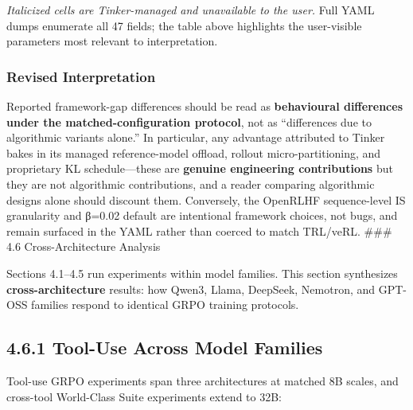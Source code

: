 \documentclass[
  american,
  11pt,
  a4paper,
  oneside]{report}
\begin{document}
\emph{Italicized cells are Tinker-managed and unavailable to the user.}
Full YAML dumps enumerate all 47 fields; the table above highlights the
user-visible parameters most relevant to interpretation.

\subsubsection{Revised Interpretation}\label{revised-interpretation}

Reported framework-gap differences should be read as \textbf{behavioural
differences under the matched-configuration protocol}, not as
``differences due to algorithmic variants alone.'' In particular, any
advantage attributed to Tinker bakes in its managed reference-model
offload, rollout micro-partitioning, and proprietary KL schedule---these
are \textbf{genuine engineering contributions} but they are not
algorithmic contributions, and a reader comparing algorithmic designs
alone should discount them. Conversely, the OpenRLHF sequence-level IS
granularity and β=0.02 default are intentional framework choices, not
bugs, and remain surfaced in the YAML rather than coerced to match
TRL/veRL. \#\#\# 4.6 Cross-Architecture Analysis

Sections 4.1--4.5 run experiments within model families. This section
synthesizes \textbf{cross-architecture} results: how Qwen3, Llama,
DeepSeek, Nemotron, and GPT-OSS families respond to identical GRPO
training protocols.

\subsection{4.6.1 Tool-Use Across Model
Families}\label{tool-use-across-model-families}

Tool-use GRPO experiments span three architectures at matched 8B scales,
and cross-tool World-Class Suite experiments extend to 32B:
\end{document}

